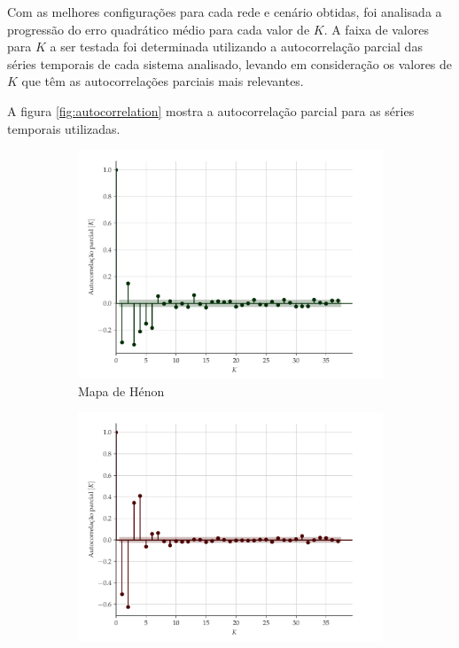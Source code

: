 \documentclass[a4paper, 12pt]{article}
\begin{document}
Com as melhores configurações para cada rede e cenário obtidas, foi analisada a progressão do erro quadrático médio para cada valor de $K$. A faixa de valores para $K$ a ser testada foi determinada utilizando a autocorrelação parcial das séries temporais de cada sistema analisado, levando em consideração os valores de $K$ que têm as autocorrelações parciais mais relevantes.

A figura \ref{fig:autocorrelation} mostra a autocorrelação parcial para as séries temporais utilizadas.
\begin{figure}[H]
     \begin{subfigure}[t]{0.35\textwidth}
         \includegraphics[scale=0.35]{autocorrelacao-parcial-henon.pdf}
         \caption{Mapa de Hénon}
     \end{subfigure}
     \centering
     \begin{subfigure}[t]{0.35\textwidth} 
         \includegraphics[scale=0.35]{autocorrelacao-parcial-logistic.pdf}

\end{subfigure}
\end{figure}
\end{document}
